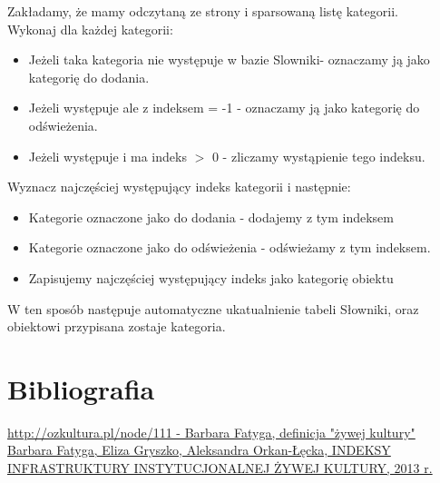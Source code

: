 \documentclass[a4 122pt]{article}
\begin{document}
			Zakładamy, że mamy odczytaną ze strony i sparsowaną listę kategorii.\\
			
			\noindent Wykonaj dla każdej kategorii:
			\begin{itemize}
				\item Jeżeli taka kategoria nie występuje w bazie Slowniki- oznaczamy ją jako kategorię do dodania.
				\item Jeżeli występuje ale z indeksem = -1 - oznaczamy ją jako kategorię do odświeżenia.
				\item Jeżeli występuje i ma indeks $>$ 0 - zliczamy wystąpienie tego indeksu.
			\end{itemize}
			
			\noindent Wyznacz najczęściej występujący indeks kategorii i następnie:
			\begin{itemize}
				\item Kategorie oznaczone jako do dodania - dodajemy z tym indeksem
				\item Kategorie oznaczone jako do odświeżenia - odświeżamy z tym indeksem.
				\item Zapisujemy najczęściej występujący indeks jako kategorię obiektu
			\end{itemize}
			
			W ten sposób następuje automatyczne ukatualnienie tabeli Słowniki, oraz obiektowi przypisana zostaje kategoria.
			
		\section{Bibliografia}
			
			\noindent [1] \href{http://ozkultura.pl/node/111}{http://ozkultura.pl/node/111 - Barbara Fatyga, definicja "żywej kultury"}\\
			\noindent [2] \href{http://ozkultura.pl/node/1800}{Barbara Fatyga, Eliza Gryszko, Aleksandra Orkan-Łęcka, INDEKSY INFRASTRUKTURY INSTYTUCJONALNEJ ŻYWEJ KULTURY, 2013 r.}
			
\end{document}
